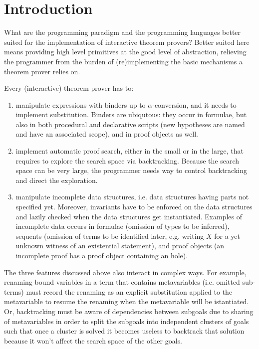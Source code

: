 \documentclass[preprint]{sigplanconf}
\begin{document}
\section{Introduction}
What are the programming paradigm and the programming languages better suited for the implementation of interactive theorem provers? Better suited here means providing high level primitives at the good level of abstraction, relieving the programmer from the burden of (re)implementing the basic mechanisms a theorem prover relies on.

Every (interactive) theorem prover has to:
\begin{enumerate}
\item manipulate expressions with binders up to $\alpha$-conversion, and it needs to implement substitution. Binders are ubiqutous: they occur in formulae, but also in both procedural and declarative scripts (new hypotheses are named and have an associated scope), and in proof objects as well.
\item implement automatic proof search, either in the small or in the large, that requires to explore the search space via backtracking. Because the search space can be very large, the programmer needs way to control backtracking and direct the exploration.
\item manipulate incomplete data structures, i.e. data structures having parts not specified yet. Moreover, invariants have to be enforced on the data structures and lazily checked when the data structures get instantiated. Examples of incomplete data occurs in formulae (omission of types to be inferred), sequents (omission of terms to be identified later, e.g. writing $X$ for a yet unknown witness of an existential statement), and proof objects (an incomplete proof has a proof object containing an hole).
\end{enumerate}

The three features discussed above also interact in complex ways. For example, renaming bound variables in a term that contains metavariables (i.e. omitted sub-terms) must record the renaming as an explicit substitution applied to the metavariable to resume the renaming when the metavariable will be istantiated. Or, backtracking must be aware of dependencies between subgoals due to sharing of metavariables in order to split the subgoals into independent clusters of goals such that once a cluster is solved it becomes useless to backtrack that solution because it won't affect the search space of the other goals.
\end{document}
